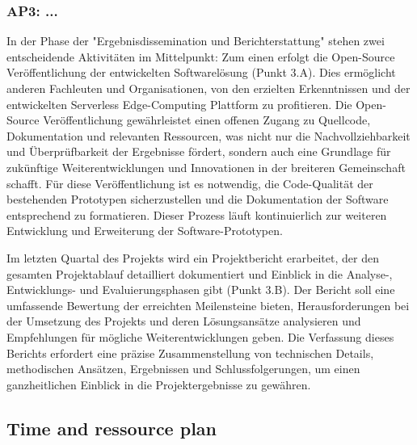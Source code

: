 \subsubsection{AP3: ...}
\label{subsec:ap:3}

In der Phase der "Ergebnisdissemination und Berichterstattung" stehen zwei entscheidende Aktivitäten im Mittelpunkt:
Zum einen erfolgt die Open-Source Veröffentlichung der entwickelten Softwarelösung (Punkt 3.A).
Dies ermöglicht anderen Fachleuten und Organisationen, von den erzielten Erkenntnissen und der entwickelten Serverless Edge-Computing Plattform zu profitieren.
Die Open-Source Veröffentlichung gewährleistet einen offenen Zugang zu Quellcode, Dokumentation und relevanten Ressourcen, was nicht nur die Nachvollziehbarkeit und Überprüfbarkeit der Ergebnisse fördert, sondern auch eine Grundlage für zukünftige Weiterentwicklungen und Innovationen in der breiteren Gemeinschaft schafft.
Für diese Veröffentlichung ist es notwendig, die Code-Qualität der bestehenden Prototypen sicherzustellen und die Dokumentation der Software entsprechend zu formatieren.
Dieser Prozess läuft kontinuierlich zur weiteren Entwicklung und Erweiterung der Software-Prototypen.

Im letzten Quartal des Projekts wird ein Projektbericht erarbeitet, der den gesamten Projektablauf detailliert dokumentiert und Einblick in die Analyse-, Entwicklungs- und Evaluierungsphasen gibt (Punkt 3.B).
Der Bericht soll eine umfassende Bewertung der erreichten Meilensteine bieten, Herausforderungen bei der Umsetzung des Projekts und deren Lösungsansätze analysieren und Empfehlungen für mögliche Weiterentwicklungen geben.
Die Verfassung dieses Berichts erfordert eine präzise Zusammenstellung von technischen Details, methodischen Ansätzen, Ergebnissen und Schlussfolgerungen, um einen ganzheitlichen Einblick in die Projektergebnisse zu gewähren.


\subsection{Time and ressource plan}
\label{subsec:zeitplan}


